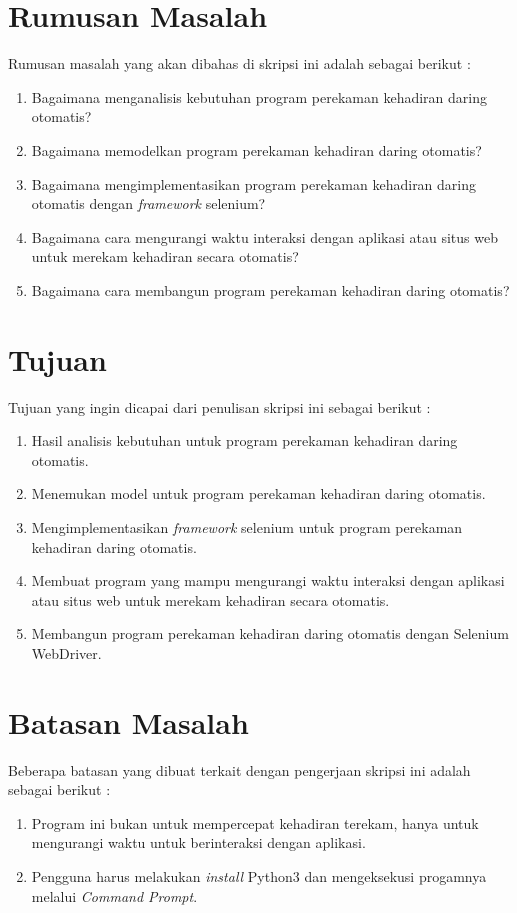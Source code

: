 \section{Rumusan Masalah}
\label{sec:rumusan}
Rumusan masalah yang akan dibahas di skripsi ini adalah sebagai berikut :
\begin{enumerate}
	\item Bagaimana menganalisis kebutuhan program perekaman kehadiran daring otomatis?
	\item Bagaimana memodelkan program perekaman kehadiran daring otomatis?
	\item Bagaimana mengimplementasikan program perekaman kehadiran daring otomatis dengan \textit{framework} selenium?
	\item Bagaimana cara mengurangi waktu interaksi dengan aplikasi atau situs web untuk merekam kehadiran secara otomatis?
	\item Bagaimana cara membangun program perekaman kehadiran daring otomatis?
\end{enumerate}

\section{Tujuan}
\label{sec:tujuan}
Tujuan yang ingin dicapai dari penulisan skripsi ini sebagai berikut :
\begin{enumerate}
	\item Hasil analisis kebutuhan untuk program perekaman kehadiran daring otomatis.
	\item Menemukan model untuk program perekaman kehadiran daring otomatis.
	\item Mengimplementasikan \textit{framework} selenium untuk program perekaman kehadiran daring otomatis.
	\item Membuat program yang mampu mengurangi waktu interaksi dengan aplikasi atau situs web untuk merekam kehadiran secara otomatis.
	\item Membangun program perekaman kehadiran daring otomatis dengan Selenium WebDriver.
\end{enumerate}

\section{Batasan Masalah}
\label{sec:batasan}
Beberapa batasan yang dibuat terkait dengan pengerjaan skripsi ini adalah sebagai berikut :
\begin{enumerate}
	\item Program ini bukan untuk mempercepat kehadiran terekam, hanya untuk mengurangi waktu untuk berinteraksi dengan aplikasi.
	\item Pengguna harus melakukan \textit{install} Python3 dan mengeksekusi progamnya melalui \textit{Command Prompt}.
\end{enumerate}


